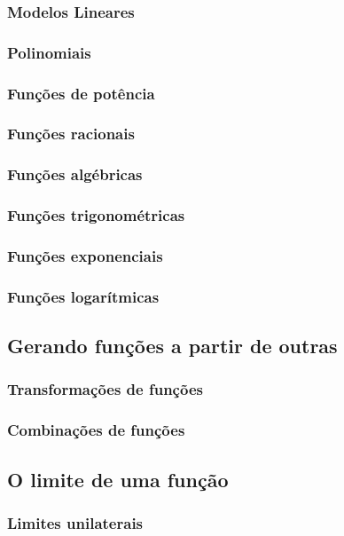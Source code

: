 \subsubsection{Modelos Lineares}
\subsubsection{Polinomiais}
\subsubsection{Funções de potência}
\subsubsection{Funções racionais}
\subsubsection{Funções algébricas}
\subsubsection{Funções trigonométricas}
\subsubsection{Funções exponenciais}
\subsubsection{Funções logarítmicas}

\subsection{Gerando funções a partir de outras}
\subsubsection{Transformações de funções}
\subsubsection{Combinações de funções}

\subsection{O limite de uma função}

\subsubsection{Limites unilaterais}

